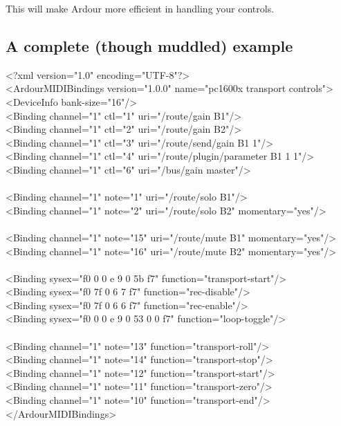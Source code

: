 \documentclass[10pt,a4paper]{book}
\begin{document}
{This will make Ardour more efficient in handling your controls.

\subsection{A complete (though muddled) example}

\begin{listing}
<?xml version="1.0" encoding="UTF-8"?>\\
<ArdourMIDIBindings version="1.0.0" name="pc1600x transport controls">\\
<DeviceInfo bank-size="16"/>\\
<Binding channel="1" ctl="1"   uri="/route/gain B1"/>\\
<Binding channel="1" ctl="2"   uri="/route/gain B2"/>\\
<Binding channel="1" ctl="3"   uri="/route/send/gain B1 1"/>\\
<Binding channel="1" ctl="4"   uri="/route/plugin/parameter B1 1 1"/>\\
<Binding channel="1" ctl="6"   uri="/bus/gain master"/>\\
\\
<Binding channel="1" note="1"  uri="/route/solo B1"/>\\
<Binding channel="1" note="2"  uri="/route/solo B2" momentary="yes"/>\\
\\
<Binding channel="1" note="15"  uri="/route/mute B1" momentary="yes"/>\\
<Binding channel="1" note="16"  uri="/route/mute B2" momentary="yes"/>\\
\\
<Binding sysex="f0 0 0 e 9 0 5b f7" function="transport-start"/>\\
<Binding sysex="f0 7f 0 6 7 f7" function="rec-disable"/>\\
<Binding sysex="f0 7f 0 6 6 f7" function="rec-enable"/>\\
<Binding sysex="f0 0 0 e 9 0 53 0 0 f7" function="loop-toggle"/>\\
\\
<Binding channel="1" note="13" function="transport-roll"/>\\
<Binding channel="1" note="14" function="transport-stop"/>\\
<Binding channel="1" note="12" function="transport-start"/>\\
<Binding channel="1" note="11" function="transport-zero"/>\\
<Binding channel="1" note="10" function="transport-end"/>\\
</ArdourMIDIBindings>\\
\end{listing}

}
\end{document}
